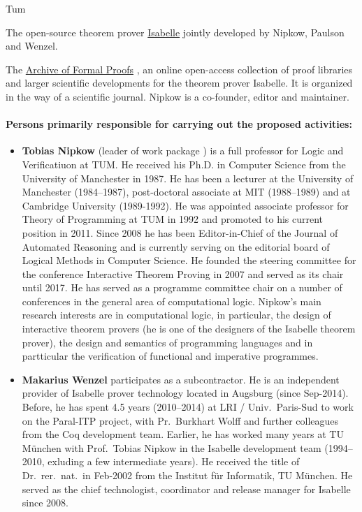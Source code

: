 \begin{sitedescription}{Tum}
\begin{compactitem}
\item The open-source theorem prover
  \href{https://isabelle.in.tum.de}{Isabelle} jointly developed by
  Nipkow, Paulson and Wenzel.
\item The \href{http://www.isa-afp.org}{Archive of Formal Proofs} \cite{isabelle-afp}, an online
open-access collection of proof libraries and larger scientific
developments for the theorem prover Isabelle. It is organized in the
way of a scientific journal.  Nipkow is a co-founder, editor and maintainer.
\end{compactitem}

\paragraph{Persons primarily responsible for carrying out the proposed activities:}

\begin{itemize}
\item \textbf{Tobias Nipkow} (leader of work package
) is a full professor for Logic and
Verificatiuon at TUM. He received his Ph.D. in Computer Science
from the University of Manchester in 1987.  He has been a
lecturer at the University of Manchester (1984--1987),
post-doctoral associate at MIT (1988--1989) and at Cambridge
University (1989-1992). He was appointed associate professor for Theory of Programming at
TUM in 1992 and promoted to his current position in 2011. Since 2008
he has been Editor-in-Chief of the  Journal of Automated Reasoning
and is currently serving on the editorial board of Logical Methods in
Computer Science. He founded the steering committee for the
conference Interactive Theorem Proving in 2007 and served as its
chair until 2017.
He has served as a programme committee chair
on a number of conferences in the general area of computational logic.  Nipkow's main research
interests are in computational logic, in particular, the design of
interactive theorem provers (he is one of the designers of the
Isabelle theorem prover), the design and semantics of programming
languages and in partticular the verification of functional and
imperative programmes.

\item \textbf{Makarius Wenzel} participates as a subcontractor. He is an independent provider of Isabelle
  prover technology located in Augsburg (since Sep-2014). Before, he
  has spent 4.5 years (2010--2014) at LRI / Univ.\ Paris-Sud to work on
  the Paral-ITP project, with Pr.~Burkhart Wolff and further
  colleagues from the Coq development team. Earlier, he has worked
  many years at TU München with Prof.\ Tobias Nipkow in the Isabelle
  development team (1994--2010, exluding a few intermediate years). He
  received the title of Dr.~rer.~nat.\ in Feb-2002 from the Institut
  für Informatik, TU München. He served as the chief technologist,
  coordinator and release manager for Isabelle since 2008.
\end{itemize}

\end{sitedescription}

